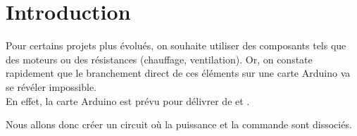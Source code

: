 
\chapter{Introduction}



Pour certains projets plus évolués, on souhaite utiliser des composants tels que des moteurs ou des résistances (chauffage, ventilation).
Or, on constate rapidement que le branchement direct de ces éléments sur une carte Arduino va se révéler impossible. \\

En effet, la carte Arduino est prévu pour délivrer de  et .

Nous allons donc créer un circuit où la puissance et la commande sont dissociés.
